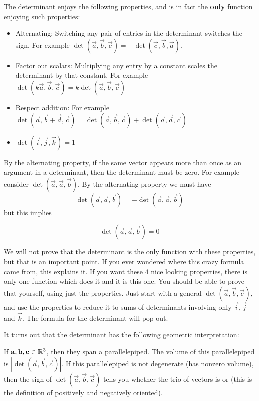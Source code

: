 \documentclass{ximera}
\begin{document}
\begin{theorem}
  The determinant enjoys the following properties, and is in fact the
  \textbf{only} function enjoying such properties:
  
  \begin{itemize}
  \item Alternating: Switching any pair of entries in the determinant
    switches the sign.  For example $\det(\vec{a},\vec{b},\vec{c}) =
    -\det(\vec{c},\vec{b},\vec{a})$.
  \item Factor out scalars: Multiplying any entry by a constant scales
    the determinant by that constant.  For example
    $\det(k\vec{a},\vec{b},\vec{c}) = k\det(\vec{a},\vec{b},\vec{c})$
  \item Respect addition: For example
    $\det(\vec{a},\vec{b}+\vec{d},\vec{c}) =
    \det(\vec{a},\vec{b},\vec{c}) +\det(\vec{a},\vec{d},\vec{c}) $
  \item $\det(\vec{i},\vec{j},\vec{k}) = 1 $
  \end{itemize}
\end{theorem}

\begin{observation}
  By the alternating property, if the same vector appears more than
  once as an argument in a determinant, then the determinant must be
  zero.  For example consider $\det(\vec{a},\vec{a},\vec{b})$. By the
  alternating property we must have
  \[
  \det(\vec{a},\vec{a},\vec{b}) = -\det(\vec{a},\vec{a},\vec{b})
  \]
  but this implies 
  
  \[
  \det(\vec{a},\vec{a},\vec{b})=0
  \]
\end{observation}
	
We will not prove that the determinant is the only function with these
properties, but that is an important point.  If you ever wondered
where this crazy formula came from, this explains it.  If you want
these $4$ nice looking properties, there is only one function which
does it and it is this one.  You should be able to prove that
yourself, using just the properties.  Just start with a general
$\det(\vec{a},\vec{b},\vec{c}) $, and use the properties to reduce it
to sums of determinants involving only $\vec{i},\vec{j}$ and
$\vec{k}$.  The formula for the determinant will pop out.
	
It turns out that the determinant has the following geometric
interpretation:
\begin{theorem}
  If $\mathbf{a},\mathbf{b},\mathbf{c} \in \mathbb R^3$, then they span a
  parallelepiped. The volume of this parallelepiped is
  $\left|\det(\vec{a},\vec{b},\vec{c})\right|$. If this parallelepiped
  is not degenerate (has nonzero volume), then the sign of
  $\det(\vec{a},\vec{b},\vec{c})$ tells you whether the trio of
  vectors is  or 
  (this is the definition of positively and negatively oriented).
\end{theorem} 
	
\end{document}
